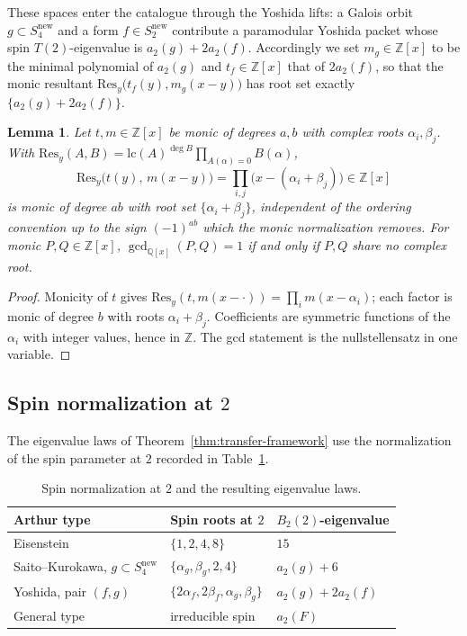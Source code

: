 \documentclass[11pt]{amsart}
\theoremstyle{plain}
\newtheorem{lemma}[theorem]{Lemma}
\theoremstyle{definition}
\newcommand{\Q}{\mathbb{Q}}
\newcommand{\Z}{\mathbb{Z}}
\newcommand{\Res}{\mathrm{Res}}
\newcommand{\snew}{S^{\mathrm{new}}}
\providecommand{\snew}{S^{\mathrm{new}}}
\begin{document}
	These spaces enter the catalogue through the Yoshida lifts: a Galois orbit
	$g\subset\snew_4$ and a form $f\in\snew_2$ contribute a paramodular
	Yoshida packet whose spin $T(2)$-eigenvalue is $a_2(g)+2a_2(f)$.
	Accordingly we set $m_g\in\Z[x]$ to be the minimal polynomial of $a_2(g)$
	and $t_f\in\Z[x]$ that of $2a_2(f)$, so that the monic resultant
	$\Res_y\bigl(t_f(y),m_g(x-y)\bigr)$ has root set exactly
	$\{a_2(g)+2a_2(f)\}$.
	
	\begin{lemma}\label{lem:resultant}
		Let $t,m\in\Z[x]$ be monic of degrees $a,b$ with complex roots
		$\alpha_i,\beta_j$. With
		$\Res_y(A,B)=\mathrm{lc}(A)^{\deg B}\prod_{A(\alpha)=0}B(\alpha)$,
		\[
		\Res_y\bigl(t(y),\,m(x-y)\bigr)
		=\prod_{i,j}\bigl(x-(\alpha_i+\beta_j)\bigr)\in\Z[x]
		\]
		is monic of degree $ab$ with root set $\{\alpha_i+\beta_j\}$, independent
		of the ordering convention up to the sign $(-1)^{ab}$ which the monic
		normalization removes. For monic $P,Q\in\Z[x]$, $\gcd_{\Q[x]}(P,Q)=1$ if
		and only if $P,Q$ share no complex root.
	\end{lemma}
	
	\begin{proof}
		Monicity of $t$ gives $\Res_y(t,m(x-\cdot))=\prod_i m(x-\alpha_i)$; each
		factor is monic of degree $b$ with roots $\alpha_i+\beta_j$. Coefficients
		are symmetric functions of the $\alpha_i$ with integer values, hence in
		$\Z$. The gcd statement is the nullstellensatz in one variable.
	\end{proof}
	
	\subsection{Spin normalization at $2$}
	\label{ss:spin-normalization}
	
	The eigenvalue laws of Theorem~\ref{thm:transfer-framework} use the
	normalization of the spin parameter at $2$ recorded in
	Table~\ref{tab:spin-normalization}.
	
	\begin{table}[ht]
		\centering
		\begin{tabular}{@{}lll@{}}
			\toprule
			Arthur type & Spin roots at $2$ & $B_2(2)$-eigenvalue \\
			\midrule
			Eisenstein & $\{1,2,4,8\}$ & $15$ \\
			Saito--Kurokawa, $g\subset\snew_4$ & $\{\alpha_g,\beta_g,2,4\}$ & $a_2(g)+6$ \\
			Yoshida, pair $(f,g)$ & $\{2\alpha_f,2\beta_f,\alpha_g,\beta_g\}$ & $a_2(g)+2a_2(f)$ \\
			General type & irreducible spin & $a_2(F)$ \\
			\bottomrule
		\end{tabular}
		\caption{Spin normalization at $2$ and the resulting eigenvalue laws.}
		\label{tab:spin-normalization}
	\end{table}
	
\end{document}
